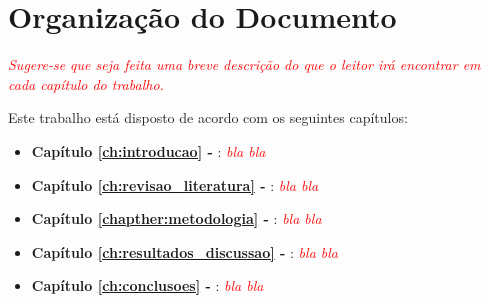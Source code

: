\section{Organização do Documento}
\label{section:organizacao}
\textit{\textcolor{red}{Sugere-se que seja feita uma breve descrição do que o leitor irá encontrar em cada capítulo do trabalho.}}

Este trabalho está disposto de acordo com os seguintes capítulos:

\begin{itemize}
    \item \textbf{Capítulo \ref{ch:introducao} - }: \textit{\textcolor{red}{bla bla}}
  
    \item \textbf{Capítulo \ref{ch:revisao_literatura} - }: \textit{\textcolor{red}{bla bla}}
  
    \item \textbf{Capítulo \ref{chapther:metodologia} - }: \textit{\textcolor{red}{bla bla}}
    
    \item \textbf{Capítulo \ref{ch:resultados_discussao} - }: \textit{\textcolor{red}{bla bla}}
    
    \item \textbf{Capítulo \ref{ch:conclusoes} - }: \textit{\textcolor{red}{bla bla}}
\end{itemize}